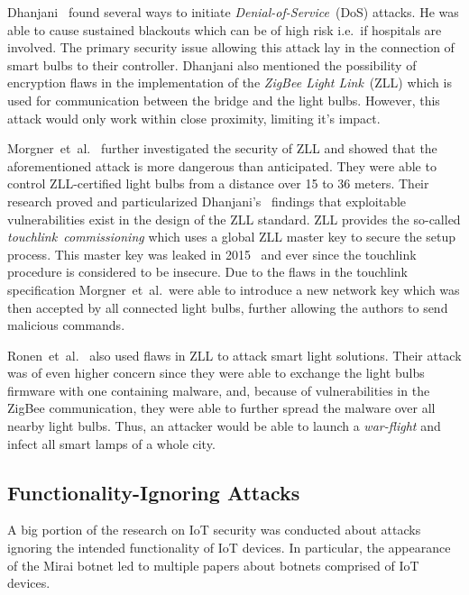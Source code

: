 Dhanjani~\cite{Dhanjani:2013:HLSEPHPWLS} found several ways to initiate \textit{Denial-of-Service}~(DoS) attacks.
He was able to cause sustained blackouts which can be of high risk i.e.\ if hospitals are involved.
The primary security issue allowing this attack lay in the connection of smart bulbs to their controller.
Dhanjani also mentioned the possibility of encryption flaws in the implementation of the \textit{ZigBee Light Link}~(ZLL) which is used for communication between the bridge and the light bulbs. However, this attack would only work within close proximity, limiting it's impact.

Morgner~et~al.~\cite{Morgner:2016:AYBBUICSSCLS} further investigated the security of ZLL and showed that the aforementioned attack is more dangerous than anticipated.
They were able to control ZLL-certified light bulbs from a distance over 15 to 36 meters.
Their research proved and particularized Dhanjani's~\cite{Dhanjani:2013:HLSEPHPWLS} findings that exploitable vulnerabilities exist in the design of the ZLL standard.
ZLL provides the so-called \textit{touchlink~commissioning} which uses a global ZLL master key to secure the setup process.
This master key was leaked in 2015~\cite{Morgner:2016:AYBBUICSSCLS} and ever since the touchlink procedure is considered to be insecure.
Due to the flaws in the touchlink specification Morgner~et~al.\ were able to introduce a new network key which was then accepted by all connected light bulbs, further allowing the authors to send malicious commands.

Ronen~et~al.~\cite{Ronen:2018:IGNCZCR} also used flaws in ZLL to attack smart light solutions.
Their attack was of even higher concern since they were able to exchange the light bulbs firmware with one containing malware, and, because of vulnerabilities in the ZigBee communication, they were able to further spread the malware over all nearby light bulbs.
Thus, an attacker would be able to launch a \textit{war-flight} and infect all smart lamps of a whole city.


\subsection{Functionality-Ignoring Attacks}
\label{sec:functionality_ignoring_attacks}
A big portion of the research on IoT security was conducted about attacks ignoring the intended functionality of IoT devices. In particular, the appearance of the Mirai botnet \cite{Antonakakis:2017:UMB} led to multiple papers about botnets comprised of IoT devices.

